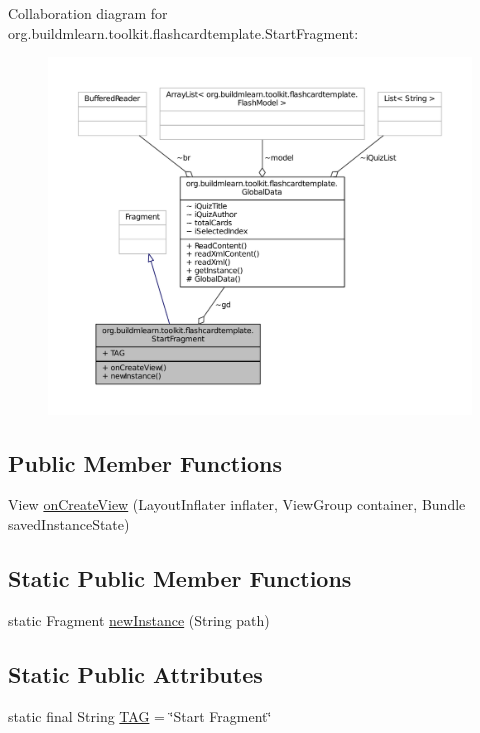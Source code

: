 Collaboration diagram for org.\-buildmlearn.\-toolkit.\-flashcardtemplate.\-Start\-Fragment\-:
\nopagebreak
\begin{figure}[H]
\begin{center}
\leavevmode
\includegraphics[width=350pt]{df/deb/classorg_1_1buildmlearn_1_1toolkit_1_1flashcardtemplate_1_1StartFragment__coll__graph}
\end{center}
\end{figure}
\subsection*{Public Member Functions}
\begin{DoxyCompactItemize}
\item 
View \hyperlink{classorg_1_1buildmlearn_1_1toolkit_1_1flashcardtemplate_1_1StartFragment_abc6a9593b570ed16d43c87aa033fb049}{on\-Create\-View} (Layout\-Inflater inflater, View\-Group container, Bundle saved\-Instance\-State)
\end{DoxyCompactItemize}
\subsection*{Static Public Member Functions}
\begin{DoxyCompactItemize}
\item 
static Fragment \hyperlink{classorg_1_1buildmlearn_1_1toolkit_1_1flashcardtemplate_1_1StartFragment_a510b67dac9f1911febf2b350fa18d4a9}{new\-Instance} (String path)
\end{DoxyCompactItemize}
\subsection*{Static Public Attributes}
\begin{DoxyCompactItemize}
\item 
static final String \hyperlink{classorg_1_1buildmlearn_1_1toolkit_1_1flashcardtemplate_1_1StartFragment_a094d9a57c85444f4c6a2116958b473ed}{T\-A\-G} = \char`\"{}Start Fragment\char`\"{}
\end{DoxyCompactItemize}


